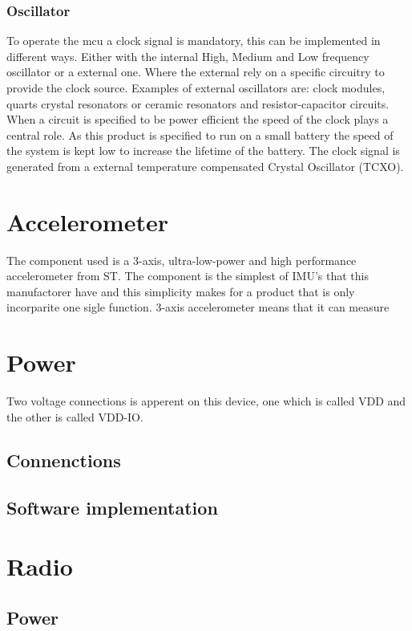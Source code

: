 \subsubsection{Oscillator}
To operate the \gls{mcu} a clock signal is mandatory, this can be implemented in different ways. Either with the internal High, Medium and Low frequency oscillator or a external one. Where the external rely on a specific circuitry to provide the clock source. Examples of external oscillators are: clock modules, quarts crystal resonators or ceramic resonators and resistor-capacitor circuits. When a circuit is specified to be power efficient the speed of the clock plays a central role. As this product is specified to run on a small battery the speed of the system is kept low to increase the lifetime of the battery. The clock signal is generated from a external temperature compensated Crystal Oscillator (TCXO).


\newpage
\section{Accelerometer} %
The component used is a 3-axis, ultra-low-power and high performance accelerometer from ST\cite{STacc}. The component is the simplest of IMU's that this manufactorer have and this simplicity makes for a product that is only incorparite one sigle function. 3-axis accelerometer means that it can measure 

\section{Power}
Two voltage connections is apperent on this device, one which is called VDD and the other is called VDD-IO. 

\subsection{Connenctions}


\subsection{Software implementation}



\newpage
\section{Radio}


\subsection{Power}


